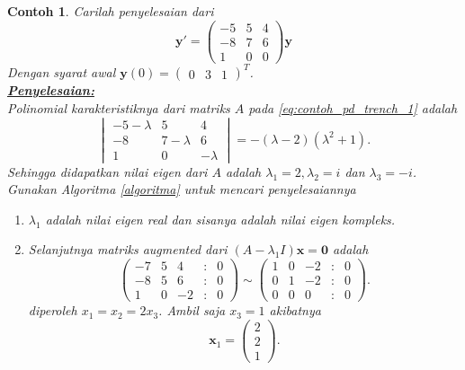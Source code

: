 \documentclass[a4paper]{article}
\theoremstyle{definisi}
\newtheorem{contoh}{Contoh}[section]
\newcommand{\penyelesaian}{\textbf{\underline{Penyelesaian:}}\\}
\numberwithin{equation}{section}
\begin{document}
  \begin{contoh}
    Carilah penyelesaian dari 
    \begin{equation}\label{eq:contoh_pd_trench_1}
      \mathbf{y'} = \begin{pmatrix}
        -5 & 5 & 4\\
        -8 & 7 & 6\\
        1 & 0 & 0
      \end{pmatrix}\mathbf{y}
    \end{equation}
    Dengan syarat awal $\mathbf{y}(0) = \begin{pmatrix}0&3&1\end{pmatrix}^T$.\\
    \penyelesaian
    Polinomial karakteristiknya dari matriks $A$ pada \eqref{eq:contoh_pd_trench_1} adalah
    \begin{equation}
      \begin{vmatrix}
        -5-\lambda & 5 & 4\\
        -8 & 7-\lambda & 6\\
        1 & 0 & -\lambda
      \end{vmatrix}=-(\lambda-2)(\lambda^2+1).
    \end{equation}
    Sehingga didapatkan nilai eigen dari $A$ adalah $\lambda_1 = 2, \lambda_2 = i$ dan $ \lambda_3 = -i$. Gunakan Algoritma \ref{algoritma} untuk mencari penyelesaiannya
    \begin{enumerate}[label=Langkah \arabic*: ,leftmargin=*]
      \item $\lambda_1$ adalah nilai eigen real dan sisanya adalah nilai eigen kompleks.
      \item Selanjutnya matriks \textit{augmented} dari $(A-\lambda_1I)\mathbf{x} = \mathbf{0}$ adalah
      \begin{equation*}
        \begin{pmatrix}
          -7 & 5 & 4 &:& 0\\
          -8 & 5 & 6 &:& 0\\
          1 & 0 & -2 &:& 0
        \end{pmatrix} \sim \begin{pmatrix}
          1 & 0 & -2 &:& 0\\
          0 & 1 & -2 & :&0\\
          0 & 0 & 0 & :&0
        \end{pmatrix}.
      \end{equation*}
      diperoleh $x_1 = x_2 = 2x_3$. Ambil saja $x_3 = 1$ akibatnya 
      \[\mathbf{x}_1 = \begin{pmatrix}2\\2\\1\end{pmatrix}.\]

\end{enumerate}
\end{contoh}
\end{document}
